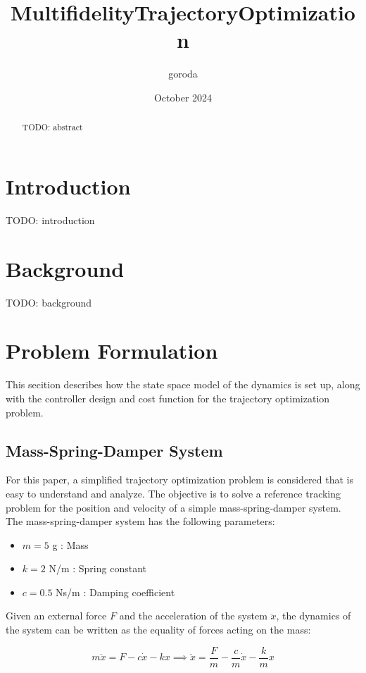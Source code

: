 \documentclass{article}
\title{MultifidelityTrajectoryOptimization}
\author{goroda }
\date{October 2024}
\begin{document}
\maketitle

\begin{abstract}
  TODO: abstract
\end{abstract}

\section{Introduction}
TODO: introduction
\section{Background}
TODO: background

\section{Problem Formulation}
This secition describes how the state space model of the dynamics is set up, along with the controller design and cost function for the trajectory optimization problem.
\subsection{Mass-Spring-Damper System}
For this paper, a simplified trajectory optimization problem is considered that is easy to understand and analyze.
The objective is to solve a reference tracking problem for the position and velocity of a simple mass-spring-damper system.
The mass-spring-damper system has the following parameters:
\begin{itemize}
  \item $m = 5$ g : Mass
  \item $k = 2$ N/m : Spring constant
  \item $c = 0.5$ Ns/m : Damping coefficient
\end{itemize}

Given an external force $F$ and the acceleration of the system $\ddot{x}$,
the dynamics of the system can be written as the equality of forces acting on the mass:

\begin{equation}
  m\ddot{x} = F - c\dot{x} - kx
  \implies \ddot{x} = \frac{F}{m} - \frac{c}{m}\dot{x} - \frac{k}{m}x
\end{equation}
\end{document}
